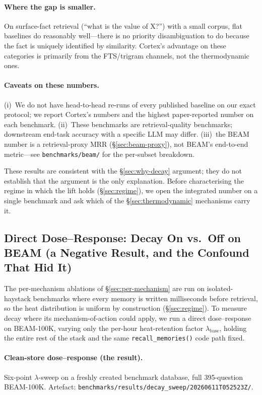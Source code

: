 \documentclass[11pt]{article}
\begin{document}
\paragraph{Where the gap is smaller.}
On surface-fact retrieval (``what is the value of X?'') with a
small corpus, flat baselines do reasonably well---there is no
priority disambiguation to do because the fact is uniquely
identified by similarity.  Cortex's advantage on these categories
is primarily from the FTS/trigram channels, not the thermodynamic
ones.

\paragraph{Caveats on these numbers.}
(i)~We do not have head-to-head re-runs of every published baseline
on our exact protocol; we report Cortex's numbers and the highest
paper-reported number on each benchmark.
(ii)~These benchmarks are retrieval-quality benchmarks; downstream
end-task accuracy with a specific LLM may differ.
(iii)~the BEAM number is a retrieval-proxy MRR
(\S\ref{sec:beam-proxy}), not BEAM's end-to-end metric---see
\texttt{benchmarks/beam/} for the per-subset breakdown.

These results are consistent with the \S\ref{sec:why-decay}
argument; they do not establish that the argument is the only
explanation.  Before characterising the regime in which the lift
holds (\S\ref{sec:regime}), we open the integrated number on a
single benchmark and ask which of the \S\ref{sec:thermodynamic} mechanisms
carry it.

\subsection{Direct Dose--Response: Decay On vs.\ Off on BEAM
(a Negative Result, and the Confound That Hid It)}
\label{sec:decay-dose}

The per-mechanism ablations of \S\ref{sec:per-mechanism} are run on
isolated-haystack benchmarks where every memory is written
milliseconds before retrieval, so the heat distribution is uniform
by construction (\S\ref{sec:regime}).  To measure decay where its
mechanism-of-action could apply, we run a direct dose--response on
BEAM-100K, varying only the per-hour heat-retention factor
$\lambda_{\mathrm{base}}$, holding the entire rest of the stack and
the same \texttt{recall\_memories()} code path fixed.

\paragraph{Clean-store dose--response (the result).}
Six-point $\lambda$-sweep on a freshly created benchmark database,
full 395-question BEAM-100K.  Artefact:
\texttt{benchmarks/results/decay\_sweep/20260611T052523Z/}.
\end{document}
